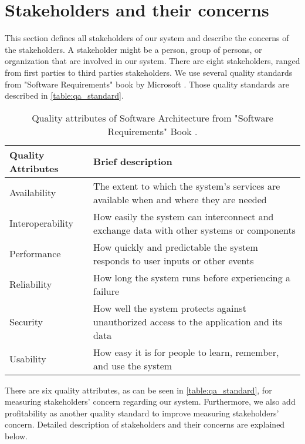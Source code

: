 \section{Stakeholders and their concerns}



This section defines all stakeholders of our system and describe the concerns of the stakeholders. A stakeholder might be a person, group of persons, or organization that are involved in our system. There are eight stakeholders, ranged from first parties to third parties stakeholders. We use several quality standards from "Software Requirements" book by Microsoft \cite{wiegers2013software}. Those quality standards are described in \autoref{table:qa_standard}.

\begin{table}[!htbp] \centering
    \caption{Quality attributes of Software Architecture from "Software Requirements" Book \cite{wiegers2013software}.}
    \label{table:qa_standard}
    \begin{tabular}{L{} L{}}
    \toprule
    \textbf{Quality Attributes} & \textbf{Brief description} \\ \midrule
    Availability & The extent to which the system's services are available when and where they are needed\\
    Interoperability & How easily the system can interconnect and exchange data with other systems or components\\
    Performance & How quickly and predictable the system responds to user inputs or other events\\
    Reliability & How long the system runs before experiencing a failure \\
    Security & How well the system protects against unauthorized access to the application and its data\\
    Usability & How easy it is for people to learn, remember, and use the system\\
    \bottomrule
    \end{tabular}
\end{table}

There are six quality attributes, as can be seen in \autoref{table:qa_standard}, for measuring stakeholders' concern regarding our system. Furthermore, we also add profitability as another quality standard to improve measuring stakeholders' concern. Detailed description of stakeholders and their concerns are explained below.

